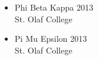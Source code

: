 \documentclass[margin]{res}
\begin{document}
\begin{resume}
\begin{itemize}
\item Phi Beta Kappa \hfill 2013 \\St. Olaf College 
\item Pi Mu Epsilon \hfill 2013 \\ St. Olaf College  \\
\end{itemize}

    
 

\end{resume}
\end{document}
